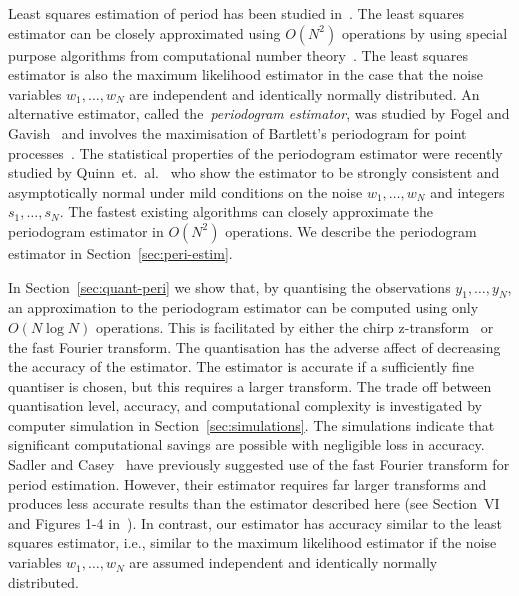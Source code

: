 \documentclass[10pt,twocolumn,twoside]{IEEEtran}
\begin{document}
Least squares estimation of period has been studied in~\cite{Clarkson2007,McKilliam2007,Quinn_sparse_noisy_SSP_2012}.  The least squares estimator can be closely approximated using $O(N^2)$ operations by using special purpose algorithms from computational number theory~\cite{McKilliam2009CoxeterLattices,McKilliam2008}.  The least squares estimator is also the maximum likelihood estimator in the case that the noise variables $w_1,\dots,w_N$ are independent and identically normally distributed.  An alternative estimator, called the~\emph{periodogram estimator}, was studied by Fogel and Gavish~\cite{Fogel1988,Fogel1989_bit_synch_zero_crossings} and involves the maximisation of Bartlett's periodogram for point processes~\cite{Bartlest_periodgram_point_process_1963}.  The statistical properties of the periodogram estimator were recently studied by Quinn~et.~al.~\cite{Quinn20013asilomar_period_est} who show the estimator to be strongly consistent and asymptotically normal under mild conditions on the noise $w_1,\dots,w_N$ and integers $s_1,\dots,s_N$.  The fastest existing algorithms can closely approximate the periodogram estimator in $O(N^2)$ operations.  We describe the periodogram estimator in Section~\ref{sec:peri-estim}.

In Section~\ref{sec:quant-peri} we show that, by quantising the observations $y_1,\dots,y_N$, an approximation to the periodogram estimator can be computed using only $O(N\log N)$ operations.  This is facilitated by either the chirp z-transform~\cite{Rabiner1969} or the fast Fourier transform.  The quantisation has the adverse affect of decreasing the accuracy of the estimator.  The estimator is accurate if a sufficiently fine quantiser is chosen, but this requires a larger transform.  The trade off between quantisation level, accuracy, and computational complexity is investigated by computer simulation in Section~\ref{sec:simulations}.  The simulations indicate that significant computational savings are possible with negligible loss in accuracy.  Sadler and Casey~\cite{726812} have previously suggested use of the fast Fourier transform for period estimation.  However, their estimator requires far larger transforms and produces less accurate results than the estimator described here (see Section~VI and Figures 1-4 in~\cite{726812}).  In contrast, our estimator has accuracy similar to the least squares estimator, i.e., similar to the maximum likelihood estimator if the noise variables $w_1,\dots,w_N$ are assumed independent and identically normally distributed.
 
\end{document}
